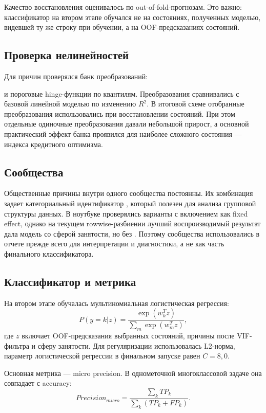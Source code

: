 Качество восстановления оценивалось по out-of-fold-прогнозам. Это важно:
классификатор на втором этапе обучался не на состояниях, полученных моделью,
видевшей ту же строку при обучении, а на OOF-предсказаниях состояний.

\subsection{Проверка нелинейностей}

Для причин проверялся банк преобразований:
\begin{center}
\end{center}
и пороговые hinge-функции по квантилям. Преобразования сравнивались с базовой
линейной моделью по изменению $R^2$. В итоговой схеме отобранные преобразования
использовались при восстановлении состояний. При этом отдельные одиночные
преобразования давали небольшой прирост, а основной практический эффект банка
проявился для наиболее сложного состояния --- индекса кредитного оптимизма.

\subsection{Сообщества}

Общественные причины внутри одного сообщества постоянны. Их комбинация задает
категориальный идентификатор , который полезен для анализа
групповой структуры данных. В ноутбуке проверялись варианты с включением
 как fixed effect, однако на текущем rowwise-разбиении
лучший воспроизводимый результат дала модель со сферой занятости, но без
. Поэтому сообщества использовались в отчете прежде
всего для интерпретации и диагностики, а не как часть финального классификатора.

\subsection{Классификатор и метрика}

На втором этапе обучалась мультиномиальная логистическая регрессия:
\begin{equation}
    P(y=k|z) = \frac{\exp(w_k^T z)}{\sum_m \exp(w_m^T z)},
\end{equation}
где $z$ включает OOF-предсказания выбранных состояний, причины после VIF-фильтра
и сферу занятости. Для регуляризации использовалась L2-норма, параметр
логистической регрессии в финальном запуске равен $C=8{,}0$.

Основная метрика --- micro precision. В однометочной многоклассовой задаче она
совпадает с accuracy:
\begin{equation}
    Precision_{micro} = \frac{\sum_k TP_k}{\sum_k (TP_k + FP_k)}.
\end{equation}

\newpage
